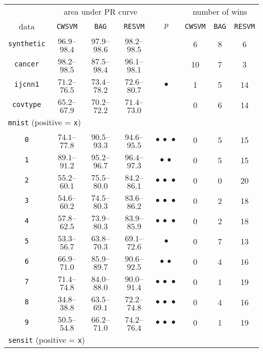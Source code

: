 \documentclass[preprint,elsarticle-num,12pt]{elsarticle}
\begin{document}
\begin{table}[!h]
\centering
\begin{tabular}{cccccccc}
\toprule
 & \multicolumn{3}{c}{area under PR curve} & & \multicolumn{3}{c}{number of wins} \\ \cline{2-4} \cline{6-8}
data & \texttt{CWSVM} & \texttt{BAG} & \texttt{RESVM} & $p$ & \texttt{CWSVM} & \texttt{BAG} & \texttt{RESVM} \\
\midrule
\texttt{synthetic} & $96.9$--$98.4$ & $97.9$--$98.6$ & $98.2$--$98.5$ &  & 6 & 8 & 6\\ 
\texttt{cancer} & $98.2$--$98.5$ & $87.5$--$98.4$ & $96.1$--$98.1$ &  & 10 & 7 & 3\\
\texttt{ijcnn1} & $71.2$--$76.5$ & $73.4$--$78.2$ & $72.6$--$80.7$ & $\bullet$ & 1 & 5 & 14\\
\texttt{covtype} & $65.2$--$67.9$ & $70.2$--$72.2$ & $71.4$--$73.0$ &  & 0 & 6 & 14\\ 
\multicolumn{3}{l}{\texttt{mnist} (positive = \texttt{x})} \\
\texttt{0} & $74.1$--$77.8$ & $90.5$--$93.3$ & $94.6$--$95.5$ & $\bullet\ \bullet\ \bullet$ & 0 & 5 & 15\\ 
\texttt{1} & $89.1$--$91.2$ & $95.2$--$96.7$ & $96.4$--$97.3$ & $\bullet\ \bullet$ & 0 & 5 & 15\\ 
\texttt{2} & $55.2$--$60.1$ & $75.5$--$80.0$ & $84.2$--$86.1$ & $\bullet\ \bullet\ \bullet$ & 0 & 0 & 20\\ 
\texttt{3} & $54.6$--$60.2$ & $74.5$--$80.3$ & $83.6$--$86.2$ & $\bullet\ \bullet\ \bullet$ & 0 & 2 & 18\\ 
\texttt{4} & $57.8$--$62.5$ & $73.9$--$80.3$ & $83.9$--$85.9$ & $\bullet\ \bullet\ \bullet$ & 0 & 2 & 18\\ 
\texttt{5} & $53.3$--$56.7$ & $63.8$--$70.3$ & $69.1$--$72.6$ & $\bullet$ & 0 & 7 & 13\\ 
\texttt{6} & $66.9$--$71.0$ & $85.9$--$89.7$ & $90.6$--$92.5$ & $\bullet\ \bullet$ & 0 & 4 & 16\\ 
\texttt{7} & $71.4$--$74.8$ & $84.0$--$88.0$ & $90.0$--$91.4$ & $\bullet\ \bullet\ \bullet$ & 0 & 1 & 19\\ 
\texttt{8} & $34.8$--$38.8$ & $63.5$--$69.1$ & $72.2$--$74.8$ & $\bullet\ \bullet\ \bullet$ & 0 & 4 & 16\\ 
\texttt{9} & $50.5$--$54.8$ & $66.2$--$71.0$ & $74.2$--$76.4$ & $\bullet\ \bullet\ \bullet$ & 0 & 1 & 19\\ 
\multicolumn{3}{l}{\texttt{sensit} (positive = \texttt{x})} \\

\end{tabular}
\end{table}
\end{document}

